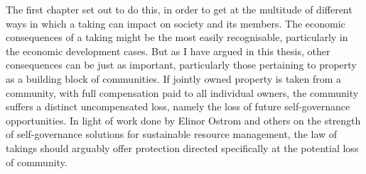 




The first chapter set out to do this, in order to get at the multitude of different ways in which a taking can impact on society and its members. The economic consequences of a taking might be the most easily recognisable, particularly in the economic development cases. But as I have argued in this thesis, other consequences can be just as important, particularly those pertaining to property as a building block of communities. If jointly owned property is taken from a community, with full compensation paid to all individual owners, the community suffers a distinct uncompensated loss, namely the loss of future self-governance opportunities. In light of work done by Elinor Ostrom and others on the strength of self-governance solutions for sustainable resource management, the law of takings should arguably offer protection directed specifically at the potential loss of community.


